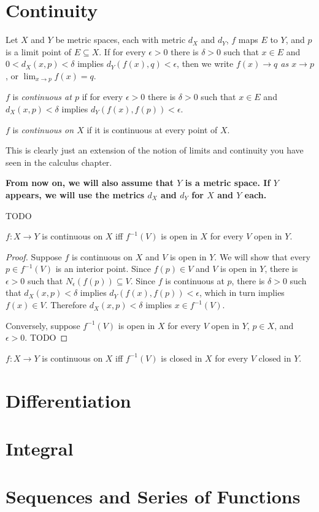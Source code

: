     \section{Continuity}
    
    \begin{defn} \label{def_analysis_continuity}
        Let $X$ and $Y$ be metric spaces, each with metric $d_X$ and $d_Y$, $f$ maps $E$ to $Y$, and $p$ is a limit point of $E \subseteq X$. If for every $\epsilon > 0$ there is $\delta > 0$ such that $x \in E$ and $0 < d_X(x,p) < \delta$ implies $d_Y(f(x), q) < \epsilon$, then we write \emph{$f(x) \to q$ as $x \to p$}, or $\lim_{x \to p} f(x) = q$.
        
        $f$ is \emph{continuous at $p$} if for every $\epsilon > 0$ there is $\delta > 0$ such that $x \in E$ and $d_X(x,p) < \delta$ implies $d_Y(f(x),f(p)) < \epsilon$.
        
        $f$ is \emph{continuous on $X$} if it is continuous at every point of $X$.
    \end{defn}
    
    This is clearly just an extension of the notion of limits and continuity you have seen in the calculus chapter.
    
    \textbf{From now on, we will also assume that $Y$ is a metric space. If $Y$ appears, we will use the metrics $d_X$ and $d_Y$ for $X$ and $Y$ each.}
    
    TODO
    
    \begin{thm} \label{thm_inverse_open}
        $f : X \to Y$ is continuous on $X$ iff $f^{-1}(V)$ is open in $X$ for every $V$ open in $Y$.
    \end{thm}
    
    \begin{proof}
        Suppose $f$ is continuous on $X$ and $V$ is open in $Y$. We will show that every $p \in f^{-1}(V)$ is an interior point. Since $f(p) \in V$ and $V$ is open in $Y$, there is $\epsilon > 0$ such that $N_{\epsilon}(f(p)) \subseteq V$. Since $f$ is continuous at $p$, there is $\delta > 0$ such that $d_X(x,p) < \delta$ implies $d_Y(f(x),f(p)) < \epsilon$, which in turn implies $f(x) \in V$. Therefore $d_X(x,p) < \delta$ implies $x \in f^{-1}(V)$.
        
        Conversely, suppose $f^{-1}(V)$ is open in $X$ for every $V$ open in $Y$, $p \in X$, and $\epsilon > 0$. TODO
    \end{proof}
    
    \begin{thm} \label{cor_inverse_closed}
        $f : X \to Y$ is continuous on $X$ iff $f^{-1}(V)$ is closed in $X$ for every $V$ closed in $Y$.
    \end{thm}
    
    \section{Differentiation}
    
    \section{Integral}
    
    \section{Sequences and Series of Functions}

